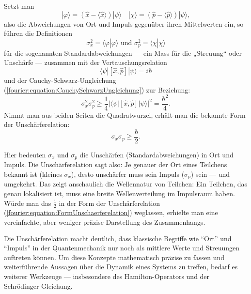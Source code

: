 		Setzt man
		\begin{equation}
			|\varphi\rangle = (\hat{x} - \langle \hat{x} \rangle) |\psi\rangle \quad |\chi\rangle = (\hat{p} - \langle \hat{p} \rangle) | \psi\rangle,
		\end{equation}
		also die Abweichungen von Ort und Impuls gegenüber ihren Mittelwerten ein, so führen die Definitionen
		\begin{equation}
			\sigma_x^2 = \langle\varphi | \varphi\rangle \text{ und } \sigma_p^2 = \langle\chi | \chi\rangle
		\end{equation}
		für die sogenannten Standardabweichungen --- ein Mass für die „Streuung“ oder Unschärfe --- zusammen mit der Vertauschungsrelation
		\begin{equation}
			\langle\psi | [\hat{x},\hat{p}] | \psi\rangle = i\hbar
		\end{equation}
		und der Cauchy-Schwarz-Ungleichung (\ref{fourier:equation:CauchySchwarzUngleichung}) zur Beziehung:
		\begin{equation}
			\sigma_x^2 \sigma_p^2 \ge \frac{1}{4} |\langle\psi | [\hat{x},\hat{p}] | \psi\rangle|^2 = \frac{\hbar^2}{4}.
		\end{equation}
		Nimmt man aus beiden Seiten die Quadratwurzel, erhält man die bekannte Form der Unschärferelation:
		\begin{equation}\label{fourier:equation:FormUnschaerferelation}
			\sigma_x \sigma_p \ge \frac{\hbar}{2}.
		\end{equation}

		Hier bedeuten $\sigma_x$ und $\sigma_p$ die Unschärfen (Standardabweichungen) in Ort und Impuls.
		Die Unschärferelation sagt also:
		Je genauer der Ort eines Teilchens bekannt ist (kleines $\sigma_x$), desto unschärfer muss sein Impuls ($\sigma_p$) sein --- und umgekehrt.
		Das zeigt anschaulich die Wellennatur von Teilchen:
		Ein Teilchen, das genau lokalisiert ist, muss eine breite Wellenverteilung im Impulsraum haben.
		Würde man das $\tfrac{1}{2}$ in der Form der Unschärferelation (\ref{fourier:equation:FormUnschaerferelation}) weglassen, erhielte man eine vereinfachte, aber weniger präzise Darstellung des Zusammenhangs.

		Die Unschärferelation macht deutlich, dass klassische Begriffe wie ``Ort'' und ``Impuls'' in der Quantenmechanik nur noch als mittlere Werte und Streuungen auftreten können.
		Um diese Konzepte mathematisch präzise zu fassen und weiterführende Aussagen über die Dynamik eines Systems zu treffen, bedarf es weiterer Werkzeuge ---
		insbesondere des Hamilton-Operators und der Schrödinger-Gleichung.

